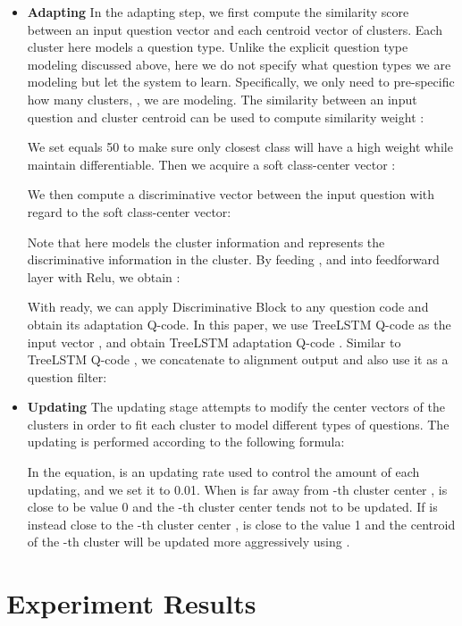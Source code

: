 \documentclass{article}
\begin{document}
\begin{itemize}
\setlength{\itemsep}{0pt}
\setlength{\parsep}{0pt}
\setlength{\parskip}{0pt}
\item \textbf{Adapting}
In the adapting step, we first compute the similarity score between an input question vector  and each centroid vector of  clusters. Each cluster here models a question type. Unlike the explicit question type modeling discussed above, here we do not specify what question types we are modeling but let the system to learn. Specifically, we only need to pre-specific how many clusters, , we are modeling. The similarity between an input question and cluster centroid can be used to compute similarity weight :



We set  equals 50 to make sure only closest class will have a high weight while maintain differentiable. Then we acquire a soft class-center vector :

We then compute a discriminative vector  between the input question with regard to the soft class-center vector:


Note that  here models the cluster information and  represents the discriminative information in the cluster. By feeding ,  and  into feedforward layer with Relu, we obtain :

With  ready, we can apply Discriminative Block to any question code and obtain its adaptation Q-code. In this paper, we use TreeLSTM Q-code as the input vector , and obtain TreeLSTM adaptation Q-code . Similar to TreeLSTM Q-code , we concatenate  to alignment output  and also use it as a question filter:





\item \textbf{Updating}  The updating stage attempts to modify the center vectors of the  clusters in order to fit each cluster to model different types of questions. The updating is performed according to the following formula:

In the equation,  is an updating rate used to control the amount of each updating, and we set it to 0.01. When  is far away from -th cluster center ,  is close to be value 0 and the -th cluster center  tends not to be updated. If  is instead close to the -th cluster center ,  is close to the value 1 and the centroid of the -th cluster  will be updated more aggressively using .
\end{itemize}

\section{Experiment Results}
\end{document}
